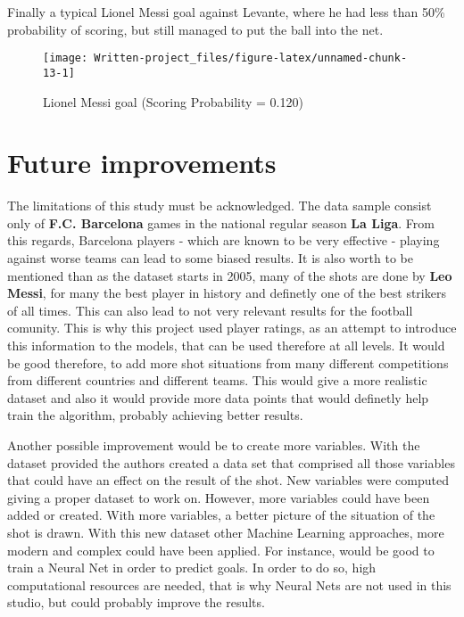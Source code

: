 \documentclass[]{article}
\begin{document}
\newpage

Finally a typical Lionel Messi goal against Levante, where he had less
than 50\% probability of scoring, but still managed to put the ball into
the net.

\begin{figure}[!h]

{\centering \texttt{[image: Written-project\_files/figure-latex/unnamed-chunk-13-1]} 

}

\caption{\label{fig:messi} Lionel Messi goal (Scoring Probability =  0.120)}\label{fig:unnamed-chunk-13}
\end{figure}

\newpage

\hypertarget{future-improvements}{%
\section{Future improvements}\label{future-improvements}}

The limitations of this study must be acknowledged. The data sample
consist only of \textbf{F.C. Barcelona} games in the national regular
season \textbf{La Liga}. From this regards, Barcelona players - which
are known to be very effective - playing against worse teams can lead to
some biased results. It is also worth to be mentioned than as the
dataset starts in 2005, many of the shots are done by \textbf{Leo
Messi}, for many the best player in history and definetly one of the
best strikers of all times. This can also lead to not very relevant
results for the football comunity. This is why this project used player
ratings, as an attempt to introduce this information to the models, that
can be used therefore at all levels. It would be good therefore, to add
more shot situations from many different competitions from different
countries and different teams. This would give a more realistic dataset
and also it would provide more data points that would definetly help
train the algorithm, probably achieving better results.

Another possible improvement would be to create more variables. With the
dataset provided the authors created a data set that comprised all those
variables that could have an effect on the result of the shot. New
variables were computed giving a proper dataset to work on. However,
more variables could have been added or created. With more variables, a
better picture of the situation of the shot is drawn. With this new
dataset other Machine Learning approaches, more modern and complex could
have been applied. For instance, would be good to train a Neural Net in
order to predict goals. In order to do so, high computational resources
are needed, that is why Neural Nets are not used in this studio, but
could probably improve the results.
\end{document}

